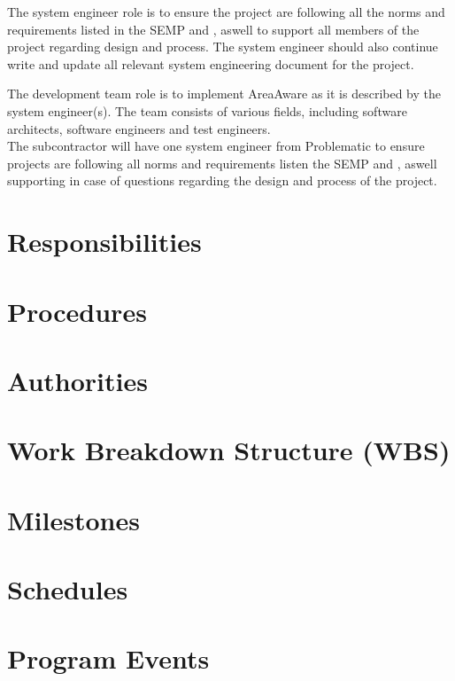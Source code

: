 The system engineer role is to ensure the project are following all the norms and requirements listed in the SEMP and , aswell to support all members of the project regarding design and process.
The system engineer should also continue write and update all relevant system engineering document for the project.

The development team role is to implement AreaAware as it is described by the system engineer(s).
The team consists of various fields, including software architects, software engineers and test engineers.\\

The subcontractor will have one system engineer from Problematic to ensure projects are following all norms and requirements listen the SEMP and , aswell supporting in case of questions regarding the design and process of the project.

\section{Responsibilities}

\section{Procedures}

\section{Authorities}

\section{Work Breakdown Structure (WBS)}



\section{Milestones}

\section{Schedules}

\section{Program Events}


